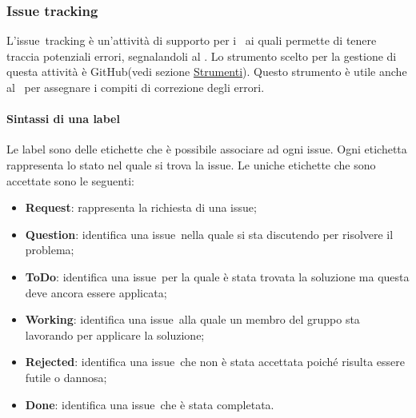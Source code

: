 \documentclass[../NormeProgetto.tex]{subfiles}
\begin{document}
	\subsubsection{Issue tracking}
		L'issue\g\ tracking è un'attività di supporto per i \verificatori\ ai quali permette di tenere traccia potenziali errori, segnalandoli al \responsabilediprogetto. Lo strumento scelto per la gestione di questa attività è GitHub(vedi sezione \hyperref[par:IssueTrk GitHub]{Strumenti}). Questo strumento è utile anche al \responsabilediprogetto\ per assegnare i compiti di correzione degli errori. 
		\paragraph{Sintassi di una label}
			Le label sono delle etichette che è possibile associare ad ogni issue\g. Ogni etichetta rappresenta lo stato nel quale si trova la issue. Le uniche etichette che sono accettate sono le seguenti:
			\begin{itemize}
				\item \textbf{Request}: rappresenta la richiesta di una issue\g;
				\item \textbf{Question}: identifica una issue\g\ nella quale si sta discutendo per risolvere il problema;
				\item \textbf{ToDo}: identifica una issue\g\ per la quale è stata trovata la soluzione ma questa deve ancora essere applicata;
				\item \textbf{Working}: identifica una issue\g\ alla quale un membro del gruppo sta lavorando per applicare la soluzione;
				\item \textbf{Rejected}: identifica una issue\g\ che non è stata accettata poiché risulta essere futile o dannosa;
				\item \textbf{Done}: identifica una issue\g\ che è stata completata.
			\end{itemize}				
\end{document}

